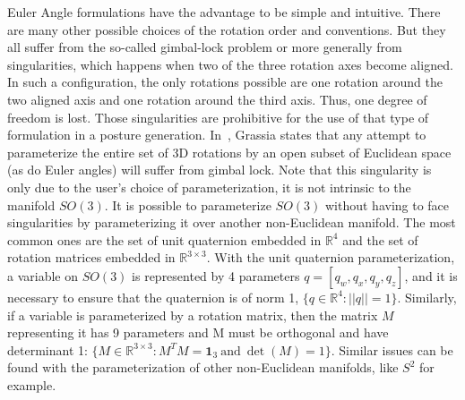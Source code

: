 Euler Angle formulations have the advantage to be simple and intuitive.
There are many other possible choices of the rotation order and conventions.
But they all suffer from the so-called gimbal-lock problem or more generally from singularities, which happens when two of the three rotation axes become aligned.
In such a configuration, the only rotations possible are one rotation around the two aligned axis and one rotation around the third axis.
Thus, one degree of freedom is lost.
Those singularities are prohibitive for the use of that type of formulation in a posture generation.
In~\cite{grassia1998}, Grassia states that any attempt to parameterize the entire set of 3D rotations by an open subset of Euclidean space (as do Euler angles) will suffer from gimbal lock.
Note that this singularity is only due to the user's choice of parameterization, it is not intrinsic to the manifold $SO(3)$.
It is possible to parameterize $SO(3)$ without having to face singularities by parameterizing it over another non-Euclidean manifold.
The most common ones are the set of unit quaternion embedded in $\mathbb{R}^4$ and the set of rotation matrices embedded in $\mathbb{R}^{3\times 3}$.
With the unit quaternion parameterization, a variable on $SO(3)$ is represented by 4 parameters $q = [q_w, q_x, q_y, q_z]$, and it is necessary to ensure that the quaternion is of norm 1, $\{q\in\mathbb{R}^4:||q||=1\}$.
Similarly, if a variable is parameterized by a rotation matrix, then the matrix $M$ representing it has 9 parameters and M must be orthogonal and have determinant 1: $\{M\in\mathbb{R}^{3\times 3}:M^T M = \mathbf{1}_3\  \text{and}\ \det (M) = 1\}$.
Similar issues can be found with the parameterization of other non-Euclidean manifolds, like $S^2$ for example.

